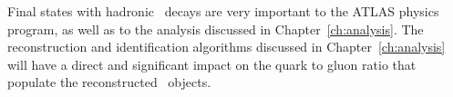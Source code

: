 	Final states with hadronic \ltau\ decays are very important to the \ac{ATLAS} physics program, as well as to the analysis discussed in Chapter~\ref{ch:analysis}. 
	The reconstruction and identification algorithms discussed in Chapter~\ref{ch:analysis}  will have a direct and significant impact on the quark to gluon ratio that populate the reconstructed \ftau\ objects.
%	
